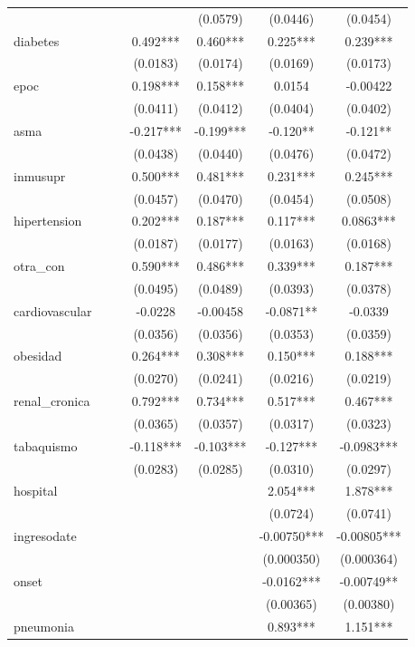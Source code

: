 \documentclass[]{article}
\begin{document}
\begin{tabular}{lcccccc}
 &  &  &  & (0.0579) & (0.0446) & (0.0454) \\
diabetes &  &  & 0.492*** & 0.460*** & 0.225*** & 0.239*** \\
 &  &  & (0.0183) & (0.0174) & (0.0169) & (0.0173) \\
epoc &  &  & 0.198*** & 0.158*** & 0.0154 & -0.00422 \\
 &  &  & (0.0411) & (0.0412) & (0.0404) & (0.0402) \\
asma &  &  & -0.217*** & -0.199*** & -0.120** & -0.121** \\
 &  &  & (0.0438) & (0.0440) & (0.0476) & (0.0472) \\
inmusupr &  &  & 0.500*** & 0.481*** & 0.231*** & 0.245*** \\
 &  &  & (0.0457) & (0.0470) & (0.0454) & (0.0508) \\
hipertension &  &  & 0.202*** & 0.187*** & 0.117*** & 0.0863*** \\
 &  &  & (0.0187) & (0.0177) & (0.0163) & (0.0168) \\
otra\_con &  &  & 0.590*** & 0.486*** & 0.339*** & 0.187*** \\
 &  &  & (0.0495) & (0.0489) & (0.0393) & (0.0378) \\
cardiovascular &  &  & -0.0228 & -0.00458 & -0.0871** & -0.0339 \\
 &  &  & (0.0356) & (0.0356) & (0.0353) & (0.0359) \\
obesidad &  &  & 0.264*** & 0.308*** & 0.150*** & 0.188*** \\
 &  &  & (0.0270) & (0.0241) & (0.0216) & (0.0219) \\
renal\_cronica &  &  & 0.792*** & 0.734*** & 0.517*** & 0.467*** \\
 &  &  & (0.0365) & (0.0357) & (0.0317) & (0.0323) \\
tabaquismo &  &  & -0.118*** & -0.103*** & -0.127*** & -0.0983*** \\
 &  &  & (0.0283) & (0.0285) & (0.0310) & (0.0297) \\
hospital &  &  &  &  & 2.054*** & 1.878*** \\
 &  &  &  &  & (0.0724) & (0.0741) \\
ingresodate &  &  &  &  & -0.00750*** & -0.00805*** \\
 &  &  &  &  & (0.000350) & (0.000364) \\
onset &  &  &  &  & -0.0162*** & -0.00749** \\
 &  &  &  &  & (0.00365) & (0.00380) \\
pneumonia &  &  &  &  & 0.893*** & 1.151*** \\

\end{tabular}
\end{document}
